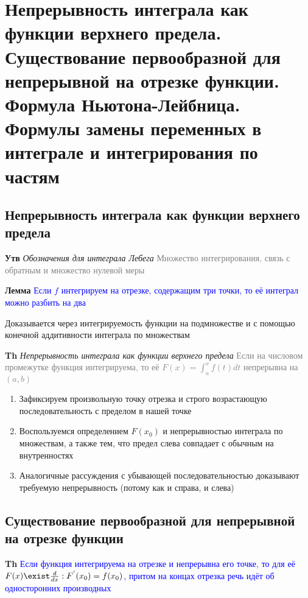 \documentclass[a4paper, 14pt]{article}
\begin{document}
    \section{Непрерывность интеграла как функции верхнего предела.
    Существование первообразной для непрерывной на отрезке функции.
    Формула Ньютона-Лейбница.
    Формулы замены переменных в интеграле и интегрирования по частям}

    \subsection{Непрерывность интеграла как функции верхнего предела}

    \textbf{Утв} \textit{Обозначения для интеграла Лебега} \textcolor{gray}{Множество интегрирования, связь с
    обратным и множество нулевой меры}

    \textbf{Лемма} \textcolor{blue}{Если $f$ интегрируем на отрезке, содержащим три точки, то её интеграл можно разбить
    на два}

    Доказывается через интегрируемость функции на подмножестве и с помощью конечной аддитивности интеграла по множествам

    \textbf{Th} \textit{Непрерывность интеграла как функции верхнего предела} \textcolor{gray}{Если на числовом
    промежутке функция интегрируема, то её $F(x) = \int_a^x f(t)dt$ непрерывна на $(a, b)$}

    \begin{enumerate}
        \item Зафиксируем произвольную точку отрезка и строго возрастающую последовательность с пределом в нашей точке
        \item Воспользуемся определением $F(x_0)$ и непрерывностью интеграла по множествам, а также тем, что
        предел слева совпадает с обычным на внутренностях
        \item Аналогичные рассуждения с убывающей последовательностью доказывают требуемую непрерывность (потому как и
        справа, и слева)
    \end{enumerate}

    \subsection{Существование первообразной для непрерывной на отрезке функции}

    \textbf{Th} \textcolor{blue}{Если функция интегрируема на отрезке и непрерывна его точке, то для её $
    F(x) \exist \frac{d}{dx}: F^{'}(x_0) = f(x_0)$, притом на концах отрезка речь идёт об односторонних производных}
\end{document}
